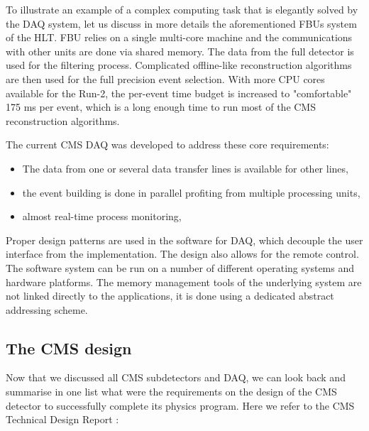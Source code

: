 \begin{normalsize}
To illustrate an example of a complex computing task that is elegantly solved by the DAQ system, let us discuss in more details the aforementioned FBUs system of the HLT. FBU relies on a single multi-core machine and the communications with other units are done via shared memory. The data from the full detector is used for the filtering process. Complicated offline-like reconstruction algorithms are then used for the full precision event selection. With more CPU cores available for the Run-2, the per-event time budget is increased to "comfortable" 175 ms per event, which is a long enough time to run most of the CMS reconstruction algorithms. 

The current CMS DAQ was developed to address these core requirements: 

\begin{itemize}
\item The data from one or several data transfer lines is available for other lines,
\item the event building is done in parallel profiting from multiple processing units,
\item almost real-time process monitoring,
\end{itemize}


Proper design patterns are used in the software for DAQ, which decouple the user  interface from the implementation. The design also allows for the remote control. The  software  system  can be run on a number of different  operating  systems  and  hardware  platforms.   The memory  management  tools  of  the  underlying  system  are not linked directly to the applications, it is done using a dedicated abstract addressing  scheme.

  
\subsection{The CMS design}

Now that we discussed all CMS subdetectors and DAQ, we can look back and summarise in one list what were the requirements on the design of the CMS detector to successfully complete its physics program. Here we refer to the CMS Technical Design Report \cite{CMS_TDR}: 



\end{normalsize}
